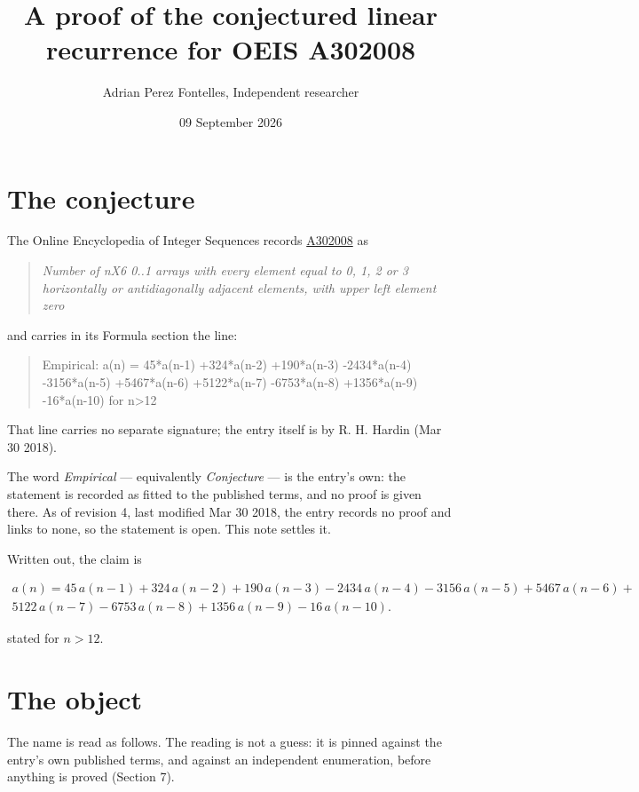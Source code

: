 \documentclass[11pt]{article}
\title{A proof of the conjectured linear recurrence for OEIS A302008}
\author{Adrian Perez Fontelles, Independent researcher}
\date{09 September 2026}
\theoremstyle{definition}
\begin{document}
\maketitle
\section{The conjecture}

The Online Encyclopedia of Integer Sequences records \href{https://oeis.org/A302008}{A302008} as

\begin{quote}\itshape Number of nX6 0..1 arrays with every element equal to 0, 1, 2 or 3 horizontally or antidiagonally adjacent elements, with upper left element zero\end{quote}

and carries in its Formula section the line:

\begin{quote}\ttfamily Empirical: a(n) = 45*a(n-1) +324*a(n-2) +190*a(n-3) -2434*a(n-4) -3156*a(n-5) +5467*a(n-6) +5122*a(n-7) -6753*a(n-8) +1356*a(n-9) -16*a(n-10) for n>12\end{quote}

That line carries no separate signature; the entry itself is by R. H. Hardin (Mar 30 2018).

The word {\itshape Empirical} --- equivalently {\itshape Conjecture} --- is the entry's own: the statement is recorded as fitted to the published terms, and no proof is given there. As of revision 4, last modified Mar 30 2018, the entry records no proof and links to none, so the statement is open. This note settles it.

Written out, the claim is

\begin{multline*} a(n) = 45\,a(n-1) + 324\,a(n-2) + 190\,a(n-3) - 2434\,a(n-4) - 3156\,a(n-5) + 5467\,a(n-6) + \\ 5122\,a(n-7) - 6753\,a(n-8) + 1356\,a(n-9) - 16\,a(n-10). \end{multline*}

stated for $n > 12$.

\section{The object}

The name is read as follows. The reading is not a guess: it is pinned against the entry's own published terms, and against an independent enumeration, before anything is proved (Section 7).
\end{document}
